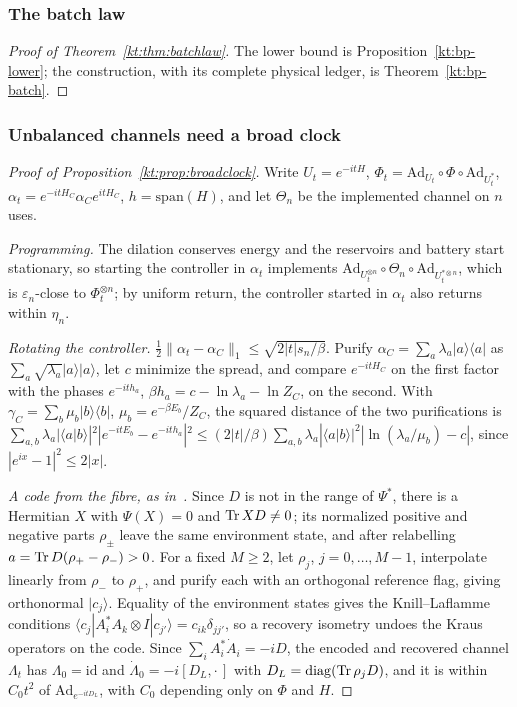 \subsubsection{The batch law}\label{kt:pf:batchlaw}

\begin{proof}[Proof of Theorem~\ref{kt:thm:batchlaw}]
The lower bound is Proposition~\ref{kt:bp-lower}; the construction, with its complete physical ledger, is Theorem~\ref{kt:bp-batch}.
\end{proof}

\subsubsection{Unbalanced channels need a broad clock}\label{kt:pf:broad}

\begin{proof}[Proof of Proposition~\ref{kt:prop:broadclock}]
Write $U_t=e^{-itH}$, $\Phi_t=\mathrm{Ad}_{U_t}\circ\Phi\circ\mathrm{Ad}_{U_t^*}$, $\alpha_t=e^{-itH_C}\alpha_Ce^{itH_C}$, $h=\mathrm{span}(H)$, and let $\Theta_n$ be the implemented channel on $n$ uses.

\emph{Programming.} The dilation conserves energy and the reservoirs and battery start stationary, so starting the controller in $\alpha_t$ implements $\mathrm{Ad}_{U_t^{\otimes n}}\circ\Theta_n\circ\mathrm{Ad}_{U_t^{*\otimes n}}$, which is $\varepsilon_n$-close to $\Phi_t^{\otimes n}$; by uniform return, the controller started in $\alpha_t$ also returns within $\eta_n$.

\emph{Rotating the controller.} $\tfrac12\|\alpha_t-\alpha_C\|_1\le\sqrt{2|t|s_n/\beta}$. Purify $\alpha_C=\sum_a\lambda_a|a\rangle\langle a|$ as $\sum_a\sqrt{\lambda_a}|a\rangle|a\rangle$, let $c$ minimize the spread, and compare $e^{-itH_C}$ on the first factor with the phases $e^{-ith_a}$, $\beta h_a=c-\ln\lambda_a-\ln Z_C$, on the second. With $\gamma_C=\sum_b\mu_b|b\rangle\langle b|$, $\mu_b=e^{-\beta E_b}/Z_C$, the squared distance of the two purifications is $\sum_{a,b}\lambda_a|\langle a|b\rangle|^2|e^{-itE_b}-e^{-ith_a}|^2\le(2|t|/\beta)\sum_{a,b}\lambda_a|\langle a|b\rangle|^2|\ln(\lambda_a/\mu_b)-c|$, since $|e^{ix}-1|^2\le2|x|$.

\emph{A code from the fibre, as in~\cite[Sec.~V]{ZhouJiang21}.} Since $D$ is not in the range of $\Psi^*$, there is a Hermitian $X$ with $\Psi(X)=0$ and $\operatorname{Tr} XD\ne0$; its normalized positive and negative parts $\rho_\pm$ leave the same environment state, and after relabelling $a=\operatorname{Tr} D(\rho_+-\rho_-)>0$. For a fixed $M\ge2$, let $\rho_j$, $j=0,\dots,M-1$, interpolate linearly from $\rho_-$ to $\rho_+$, and purify each with an orthogonal reference flag, giving orthonormal $|c_j\rangle$. Equality of the environment states gives the Knill--Laflamme conditions $\langle c_j|A_i^*A_k\otimes I|c_{j'}\rangle=c_{ik}\delta_{jj'}$, so a recovery isometry undoes the Kraus operators on the code. Since $\sum_iA_i^*\dot A_i=-iD$, the encoded and recovered channel $\Lambda_t$ has $\Lambda_0=\mathrm{id}$ and $\dot\Lambda_0=-i[D_L,\cdot\,]$ with $D_L=\mathrm{diag}(\operatorname{Tr}\rho_jD)$, and it is within $C_0t^2$ of $\mathrm{Ad}_{e^{-itD_L}}$, with $C_0$ depending only on $\Phi$ and $H$.


\end{proof}
